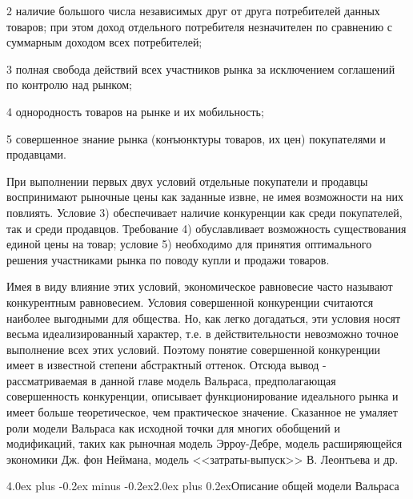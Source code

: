 \documentclass[12pt, 4paper]{book}
\makeatletter
\renewcommand{\section}{\@startsection{section}{1}{1pt}%
	{4.0ex plus -0.2ex minus -0.2ex}{2.0ex plus 0.2ex}{\centering\bf}}%
\makeatother
\begin{document}
{2 наличие большого числа независимых друг от друга потребителей данных товаров; при этом доход отдельного потребителя незначителен по сравнению с суммарным доходом всех потребителей;
\par

3 полная свобода действий всех участников рынка за исключением соглашений по контролю над рынком;
\par

4 однородность товаров на рынке и их мобильность;
\par

5 совершенное знание рынка (конъюнктуры товаров, их цен) покупателями и продавцами.
\par

При выполнении первых двух условий отдельные покупатели и продавцы воспринимают рыночные цены как заданные извне, не имея возможности на них повлиять. Условие 3) обеспечивает наличие конкуренции как среди покупателей, так и среди продавцов. Требование 4) обуславливает возможность существования единой цены на товар; условие 5) необходимо для принятия оптимального решения участниками рынка по поводу купли и продажи товаров.
\par

Имея в виду влияние этих условий, экономическое равновесие часто называют конкурентным равновесием. Условия совершенной конкуренции считаются наиболее выгодными для общества. Но, как легко догадаться, эти условия носят весьма идеализированный характер, т.е. в действительности невозможно точное выполнение всех этих условий. Поэтому понятие совершенной конкуренции имеет в известной степени абстрактный оттенок. Отсюда вывод - рассматриваемая в данной главе модель Вальраса, предполагающая совершенность конкуренции, описывает функционирование идеального рынка и имеет больше теоретическое, чем практическое значение. Сказанное не умаляет роли модели Вальраса как исходной точки для многих обобщений и модификаций, таких как рыночная модель Эрроу-Дебре, модель расширяющейся экономики Дж. фон Неймана, модель <<затраты-выпуск>> В. Леонтьева и др.
\par

\newpage
\begin{center}
\section{Описание общей модели Вальраса}
\end{center}
\par

}
\end{document}

